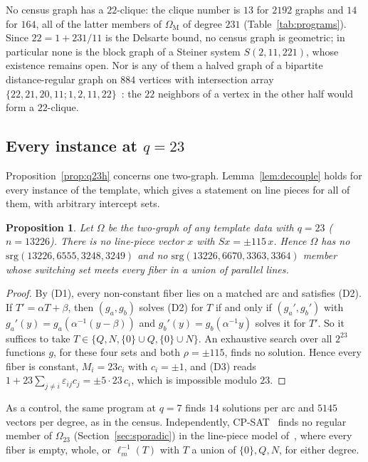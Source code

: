 \documentclass[11pt]{amsart}
\newtheorem{proposition}[theorem]{Proposition}
\theoremstyle{definition}
\theoremstyle{remark}
\newcommand{\srg}{\mathrm{srg}}
\newcommand{\OM}{\Omega_{\mathrm M}}   %
\begin{document}
No census graph has a $22$-clique: the clique number is $13$ for $2192$ graphs and $14$ for $164$, all of the latter
members of $\OM$ of degree $231$ (Table~\ref{tab:programs}). Since $22=1+231/11$ is the Delsarte bound, no census graph
is geometric; in particular none is the block graph of a Steiner system $S(2,11,221)$, whose existence remains open. Nor is any of them a halved graph of a bipartite distance-regular graph on $884$
vertices with intersection array $\{22,21,20,11;1,2,11,22\}$~\cite{BCN}: the $22$ neighbors of a vertex in the other
half would form a $22$-clique.



\subsection{Every instance at \texorpdfstring{$q=23$}{q=23}}\label{ssec:q23all}
Proposition~\ref{prop:q23h} concerns one two-graph. Lemma~\ref{lem:decouple} holds for every instance of the template,
which gives a statement on line pieces for all of them, with arbitrary intercept sets.

\begin{proposition}\label{prop:q23all}
Let $\Omega$ be the two-graph of any template data with $q=23$ ($n=13226$). There is no line-piece vector $x$ with
$Sx=\pm115\,x$. Hence $\Omega$ has no $\srg(13226,6555,3248,3249)$ and no $\srg(13226,6670,3363,3364)$ member whose
switching set meets every fiber in a union of parallel lines.
\end{proposition}
\begin{proof}
By (D1), every non-constant fiber lies on a matched arc and satisfies (D2). If $T'=\alpha T+\beta$, then $(g_a,g_b)$
solves (D2) for $T$ if and only if $(g_a',g_b')$ with $g_a'(y)=g_a(\alpha^{-1}(y-\beta))$ and
$g_b'(y)=g_b(\alpha^{-1}y)$ solves it for $T'$. So it suffices to take $T\in\{Q,N,\{0\}\cup Q,\{0\}\cup N\}$. An
exhaustive search over all $2^{23}$ functions $g$, for these four sets and both $\rho=\pm115$, finds no solution. Hence
every fiber is constant, $M_i=23c_i$ with $c_i=\pm1$, and (D3) reads
$1+23\sum_{j\ne i}\varepsilon_{ij}c_j=\pm5\cdot23\,c_i$, which is impossible modulo $23$.
\end{proof}
As a control, the same program at $q=7$ finds $14$ solutions per arc and $5145$ vectors per degree, as in the census.
Independently, CP-SAT~\cite{CPSAT} finds no regular member of $\Omega_{23}$ (Section~\ref{sec:sporadic}) in the line-piece
model of~\cite{Plummer442}, where every fiber is empty, whole, or $\ell_m^{-1}(T)$ with $T$ a union of $\{0\},Q,N$, for
either degree.
\end{document}
